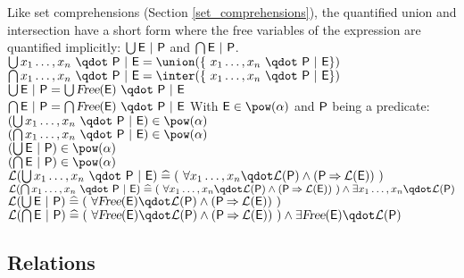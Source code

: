 \begin{samepage}
\begin{rodinrefentry}
    Like set comprehensions (Section \ref{set_comprehensions}), the quantified union and intersection have a
    short form where the free variables of the expression are quantified implicitly:
    $\bigcup\nolimits \textsf{E}~|~\textsf{P}$ and $\bigcap\nolimits \textsf{E}~|~\textsf{P}$.
  \rrdef
    $\Union x_1\ldots,x_n~\qdot~\predp~|~\expre = \union(\{~x_1\ldots,x_n~\qdot~\predp~|~\expre\})$\\
    $\Inter x_1\ldots,x_n~\qdot~\predp~|~\expre = \inter(\{~x_1\ldots,x_n~\qdot~\predp~|~\expre\})$\\
    $\Union \expre~|~\predp = \Union \freeids{\expre}~\qdot~\predp~|~\expre$\\
    $\Inter \expre~|~\predp = \Inter \freeids{\expre}~\qdot~\predp~|~\expre$
  \rrtypes
    With $\expre\in\pow(\alpha)$ and $\textsf{P}$ being a predicate:\\
    $(\Union x_1\ldots,x_n~\qdot~\predp~|~\expre) \in \pow(\alpha)$\\
    $(\Inter x_1\ldots,x_n~\qdot~\predp~|~\expre) \in \pow(\alpha)$\\
    $(\Union \expre~|~\predp) \in \pow(\alpha)$\\
    $(\Inter \expre~|~\predp) \in \pow(\alpha)$\\
  \rrwd
    $\wdl(\Union x_1\ldots,x_n~\qdot~\predp~|~\expre) \defi (~\forall x_1\ldots,x_n \qdot \wdl(\predp) \land (\predp\limp\wdl(\expre))~)$\\
    $\wdl(\Inter x_1\ldots,x_n~\qdot~\predp~|~\expre) \defi (~\forall x_1\ldots,x_n \qdot \wdl(\predp) \land (\predp\limp\wdl(\expre))~) \land \exists x_1\ldots,x_n \qdot \wdl(\predp)$\\
    $\wdl(\Union \expre~|~\predp) \defi (~\forall\freeids{\expre} \qdot \wdl(\predp) \land (\predp\limp\wdl(\expre))~)$\\
    $\wdl(\Inter \expre~|~\predp) \defi (~\forall\freeids{\expre} \qdot \wdl(\predp) \land (\predp\limp\wdl(\expre))~) \land \exists\freeids{\expre} \qdot \wdl(\predp)$
\end{rodinrefentry}
\end{samepage}

\subsection{Relations}
\label{relations}


